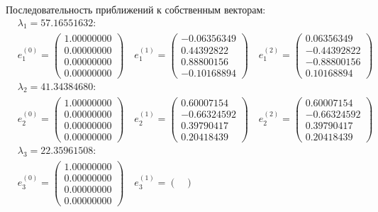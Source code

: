 \documentclass[12pt, a4paper]{article}
\begin{document}
	Последовательность приближений к собственным векторам:
	\begin{eqnarray*}
		& \lambda_1 = 57.16551632: \\
		& e_1^{(0)} = \begin{pmatrix}
			1.00000000 \\ 0.00000000 \\ 0.00000000 \\ 0.00000000
		\end{pmatrix} \quad e_1^{(1)} = \begin{pmatrix}
			-0.06356349 \\ 0.44392822 \\ 0.88800156 \\-0.10168894
		\end{pmatrix} \quad e_1^{(2)} = \begin{pmatrix}
			0.06356349 \\-0.44392822 \\-0.88800156 \\ 0.10168894
		\end{pmatrix} \\
		& \lambda_2 = 41.34384680:\\
		& e_2^{(0)} = \begin{pmatrix}
			1.00000000 \\ 0.00000000 \\ 0.00000000 \\ 0.00000000
		\end{pmatrix} \quad e_2^{(1)} = \begin{pmatrix}
			0.60007154 \\-0.66324592 \\ 0.39790417 \\ 0.20418439
		\end{pmatrix} \quad e_2^{(2)} = \begin{pmatrix}
			0.60007154 \\-0.66324592 \\ 0.39790417 \\ 0.20418439
		\end{pmatrix} \\
		& \lambda_3 = 22.35961508:\\
		& e_3^{(0)} = \begin{pmatrix}
			1.00000000 \\ 0.00000000 \\ 0.00000000 \\ 0.00000000
		\end{pmatrix} \quad e_3^{(1)} = \begin{pmatrix}

\end{pmatrix}
\end{eqnarray*}
\end{document}
